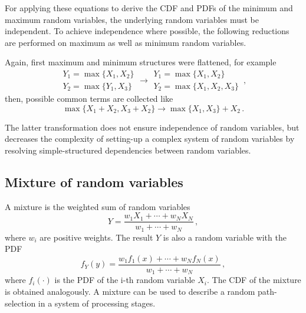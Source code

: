 For applying these equations to derive the CDF and PDFs of the minimum and maximum random variables, the 
underlying random variables must be independent. To achieve independence where possible, the following 
reductions are performed on maximum as well as minimum random variables.

Again, first maximum and minimum structures were flattened, for example
\begin{equation}
 \begin{array}{l}
  Y_1 = \max\{X_1,X_2\}\\
  Y_2 = \max\{Y_1,X_3\}
 \end{array} \longrightarrow
 \begin{array}{l}
  Y_1 = \max\{X_1,X_2\}\\
  Y_2 = \max\{X_1,X_2,X_3\}
 \end{array}\,, \nonumber
\end{equation}
then, possible common terms are collected like
\begin{equation}
 \max\{X_1 + X_2, X_3 + X_2\} \longrightarrow \max\{X_1,X_3\}+X_2\,. \nonumber
\end{equation}

The latter transformation does not ensure independence of random variables, but 
decreases the complexity of setting-up a complex system of random variables by 
resolving simple-structured dependencies between random variables.

\subsection{Mixture of random variables}
A mixture is the weighted sum of random variables
\begin{equation}
 Y = \frac{w_1X_1+\cdots+w_NX_N}{w_1+\cdots+w_N}\,, \nonumber
\end{equation}
where $w_i$ are positive weights. The result $Y$ is also a random variable with the PDF
\begin{equation}
 f_Y(y) = \frac{w_1f_1(x)+\cdots+w_Nf_N(x)}{w_1+\cdots+w_N}\,,\nonumber
\end{equation}
where $f_i(\cdot)$ is the PDF of the i-th random variable $X_i$. The CDF of the
mixture is obtained analogously. A mixture can be used to describe a random 
path-selection in a system of processing stages. 

